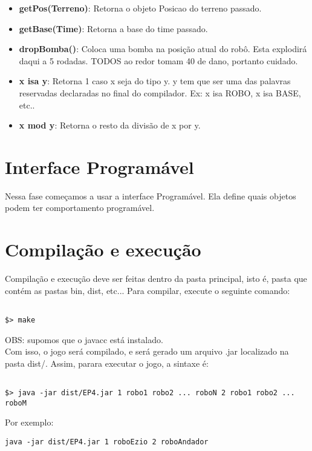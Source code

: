 \documentclass[11pt]{article}
\begin{document}
\begin{itemize}
    \item \textbf{getPos(Terreno)}: Retorna o objeto Posicao do terreno passado.
    
    \item \textbf{getBase(Time)}: Retorna a base do time passado.
    
    \item \textbf{dropBomba()}: Coloca uma bomba na posição atual do robô. Esta explodirá daqui a 5 rodadas. TODOS ao redor tomam 40 de dano, portanto cuidado.
    
    \item \textbf{x isa y}: Retorna 1 caso x seja do tipo y. y tem que ser uma das palavras reservadas declaradas no final do compilador. Ex: x isa ROBO, x isa BASE, etc..
    
    \item \textbf{x mod y}: Retorna o resto da divisão de x por y.
\end{itemize}


\section{Interface Programável}

Nessa fase começamos a usar a interface Programável. Ela define quais objetos podem ter comportamento programável.


\section{Compilação e execução}

Compilação e execução deve ser feitas dentro da pasta principal, isto é, pasta que contém as pastas bin, dist, etc...
Para compilar, execute o seguinte comando:


\begin{verbatim}

$> make

\end{verbatim}
OBS: supomos que o javacc está instalado.
\\Com isso, o jogo será compilado, e será gerado um arquivo .jar localizado na pasta dist/. Assim, parara executar o jogo, a sintaxe é:

\begin{verbatim}

$> java -jar dist/EP4.jar 1 robo1 robo2 ... roboN 2 robo1 robo2 ... roboM

\end{verbatim}

Por exemplo: 

\begin{verbatim}
java -jar dist/EP4.jar 1 roboEzio 2 roboAndador
\end{verbatim}
\end{document}
